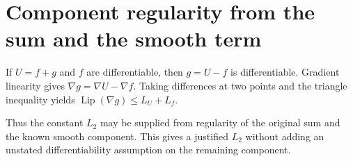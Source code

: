 \documentclass[11pt,a4paper]{article}
\begin{document}
\section{\texorpdfstring{Component regularity from the sum and the smooth term}{Component regularity from the sum and the smooth term}}


If \(U=f+g\) and \(f\) are differentiable, then \(g=U-f\) is differentiable. Gradient linearity gives \(\nabla g=\nabla U-\nabla f\). Taking differences at two points and the triangle inequality yields \(\operatorname{Lip}(\nabla g)\le L_U+L_f\).



Thus the constant \(L_2\) may be supplied from regularity of the original sum and the known smooth component. This gives a justified \(L_2\) without adding an unstated differentiability assumption on the remaining component.
\end{document}
